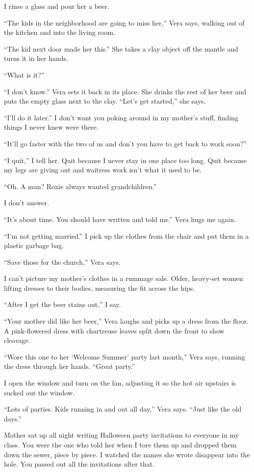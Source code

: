 \documentclass[twoside,10pt]{book}
\begin{document}
I rinse a glass and pour her a beer.

``The kids in the neighborhood are going to miss her,'' Vera says,
walking out of the kitchen and into the living room.

``The kid next door made her this.'' She takes a clay object off the
mantle and turns it in her hands.

``What is it?''

``I don't know.'' Vera sets it back in its place. She drinks the rest of
her beer and puts the empty glass next to the clay. ``Let's get
started,'' she says.

``I'll do it later.'' I don't want you poking around in my mother's
stuff, finding things I never knew were there.

``It'll go faster with the two of us and don't you have to get back to
work soon?''

``I quit,'' I tell her. Quit because I never stay in one place too long.
Quit because my legs are giving out and waitress work isn't what it used
to be.

``Oh. A man? Roxie always wanted grandchildren.''

I don't answer.

``It's about time. You should have written and told me.'' Vera hugs me
again.

``I'm not getting married.'' I pick up the clothes from the chair and
put them in a plastic garbage bag.

``Save those for the church,'' Vera says.

I can't picture my mother's clothes in a rummage sale. Older, heavy-set
women lifting dresses to their bodies, measuring the fit across the
hips.

``After I get the beer stains out,'' I say.

``Your mother did like her beer,'' Vera laughs and picks up a dress from
the floor. A pink-flowered dress with chartreuse leaves split down the
front to show cleavage.

``Wore this one to her `Welcome Summer' party last month,'' Vera says,
running the dress through her hands. ``Great party.''

I open the window and turn on the fan, adjusting it so the hot air
upstairs is sucked out the window.

``Lots of parties. Kids running in and out all day,'' Vera says. ``Just
like the old days.''

Mother sat up all night writing Halloween party invitations to everyone
in my class. You were the one who told her when I tore them up and
dropped them down the sewer, piece by piece. I watched the names she
wrote disappear into the hole. You passed out all the invitations after
that.
\end{document}
